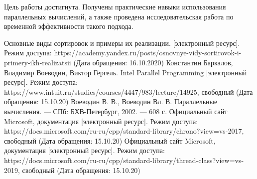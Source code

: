 \documentclass[12pt]{report}
\begin{document}
 Цель работы достигнута. Получены практические навыки использования параллельных вычислений, а также проведена исследовательская работа по временной эффективности такого подхода.     


\begin{thebibliography}{2}
	 Основные виды сортировок и примеры их реализации. [электронный ресурс]. Режим доступа: https://academy.yandex.ru/posts/osnovnye-vidy-sortirovok-i-primery-ikh-realizatsii
	(Дата обращения: 16.10.2020)
	Константин Баркалов, Владимир Воеводин, Виктор Гергель. Intel Parallel Programming [электронный ресурс]. Режим доступа: https://www.intuit.ru/studies/courses/4447/983/lecture/14925, свободный (Дата обращения: 15.10.20)
	Воеводин В. В., Воеводин Вл. В. Параллельные вычисления. — СПб: БХВ-Петербург, 2002. — 608 с.
	 Официальный сайт Microsoft, документация [электронный ресурс]. Режим доступа: https://docs.microsoft.com/ru-ru/cpp/standard-library/chrono?view=vs-2017, свободный (Дата обращения: 15.10.20)
	 Официальный сайт Microsoft, документация [электронный ресурс]. Режим доступа: https://docs.microsoft.com/ru-ru/cpp/standard-library/thread-class?view=vs-2019, свободный (Дата обращения: 15.10.20)
	
\end{thebibliography}
\end{document}
